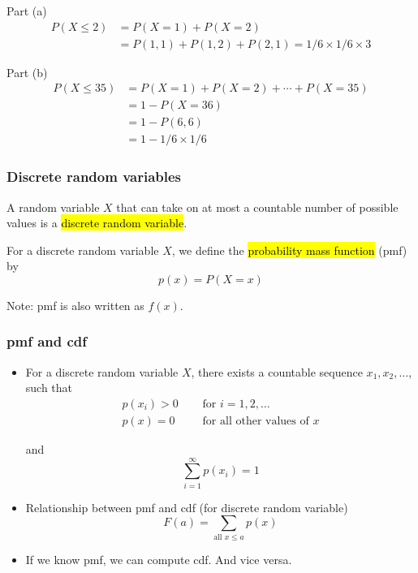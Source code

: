 \documentclass[slidestop,compress,mathserif]{beamer}
\begin{document}
\begin{frame}


\pause
Part (a)
\begin{align*}
P(X \leq 2) &= P(X = 1) + P(X = 2) \\
&=  P(1, 1) + P(1, 2) + P(2, 1) = 1 / 6 \times 1 / 6 \times 3
\end{align*}

\pause
Part (b)
\begin{align*}
P(X \leq 35) & = P(X = 1) + P(X = 2) + \cdots + P(X = 35)\\
&= 1 - P(X = 36) \\
 &= 1 - P(6, 6) \\
&=  1 - 1 / 6 \times 1 / 6 
\end{align*}
\end{frame}




\begin{frame}\frametitle{Discrete random variables}
\begin{defn}
\begin{dinglist}{\DingListSymbolA}
\item A random variable $X$ that can take on at most a countable number of possible values is a
\hl{discrete random variable}.
\item For a discrete random variable $X$, we define the \hl{probability mass function} (pmf) by
\[ p(x) = P(X = x) \]
\end{dinglist}
\end{defn}
\vspace{-0.1cm}
Note: pmf is also written as $f(x)$.


\end{frame}


\begin{frame}\frametitle{pmf and cdf}
\begin{itemize}
\item For a discrete random variable $X$, there exists a countable sequence $x_1, x_2, \ldots$, such that
\begin{align*}
p(x_i) > 0 & \quad\text{ for } i = 1, 2, \ldots\\
p(x) = 0 & \quad\text{ for all other values of }x
\end{align*}

and
\[ \sum_{i=1}^\infty p(x_i) = 1 \]


\item Relationship between pmf and cdf (for discrete random variable)
\[ F(a) = \sum_{\text{all } x \leq a} p(x)\]

\item If we know pmf, we can compute cdf. And vice versa.

\end{itemize}

\end{frame}
\end{document}
